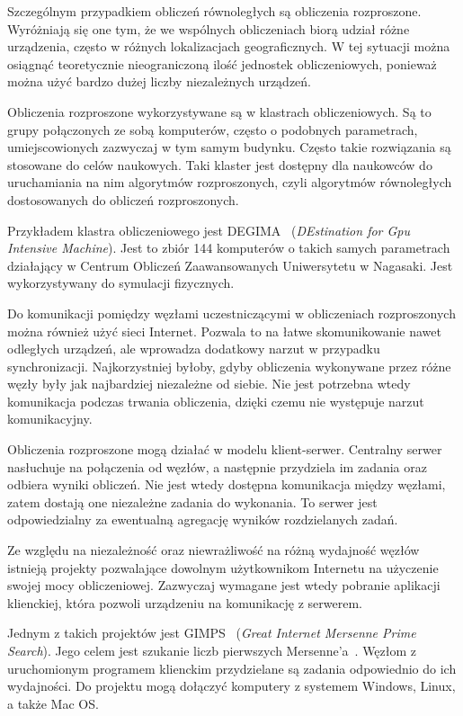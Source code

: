 \documentclass[a4paper,11pt,twoside]{report}
\theoremstyle{definition}
\begin{document}
    Szczególnym przypadkiem obliczeń równoległych są obliczenia rozproszone.
    Wyróżniają się one tym, że we wspólnych obliczeniach biorą udział różne urządzenia, często w różnych lokalizacjach geograficznych.
    W tej sytuacji można osiągnąć teoretycznie nieograniczoną ilość jednostek obliczeniowych,
    ponieważ można użyć bardzo dużej liczby niezależnych urządzeń.
    
    Obliczenia rozproszone wykorzystywane są w klastrach obliczeniowych.
    Są to grupy połączonych ze sobą komputerów, często o podobnych parametrach, umiejscowionych zazwyczaj w tym samym budynku.
    Często takie rozwiązania są stosowane do celów naukowych.
    Taki klaster jest dostępny dla naukowców do uruchamiania na nim algorytmów rozproszonych, czyli algorytmów równoległych dostosowanych do obliczeń rozproszonych.
    
    Przykładem klastra obliczeniowego jest DEGIMA~\cite{DEGIMA} (\textit{DEstination for Gpu Intensive Machine}).
    Jest to zbiór 144 komputerów o takich samych parametrach działający w Centrum Obliczeń Zaawansowanych Uniwersytetu w Nagasaki.
    Jest wykorzystywany do symulacji fizycznych.
    
    Do komunikacji pomiędzy węzłami uczestniczącymi w obliczeniach rozproszonych można również użyć sieci Internet.
    Pozwala to na łatwe skomunikowanie nawet odległych urządzeń, ale wprowadza dodatkowy narzut w przypadku synchronizacji.
    Najkorzystniej byłoby, gdyby obliczenia wykonywane przez różne węzły były jak najbardziej niezależne od siebie.
    Nie jest potrzebna wtedy komunikacja podczas trwania obliczenia, dzięki czemu nie występuje narzut komunikacyjny.
    
    Obliczenia rozproszone mogą działać w modelu klient-serwer.
    Centralny serwer nasłuchuje na połączenia od węzłów, a następnie przydziela im zadania oraz odbiera wyniki obliczeń.
    Nie jest wtedy dostępna komunikacja między węzłami, zatem dostają one niezależne zadania do wykonania.
    To serwer jest odpowiedzialny za ewentualną agregację wyników rozdzielanych zadań.
    
    Ze względu na niezależność oraz niewrażliwość na różną wydajność węzłów istnieją projekty
    pozwalające dowolnym użytkownikom Internetu na użyczenie swojej mocy obliczeniowej.
    Zazwyczaj wymagane jest wtedy pobranie aplikacji klienckiej, która pozwoli urządzeniu na komunikację
    z serwerem.
    
    Jednym z takich projektów jest GIMPS~\cite{GIMPS} (\textit{Great Internet Mersenne Prime Search}).
    Jego celem jest szukanie liczb pierwszych Mersenne'a~\cite{MersennePrimes}.
    Węzłom z uruchomionym programem klienckim przydzielane są zadania odpowiednio do ich wydajności.
    Do projektu mogą dołączyć komputery z systemem Windows, Linux, a także Mac OS.
    
\end{document}
